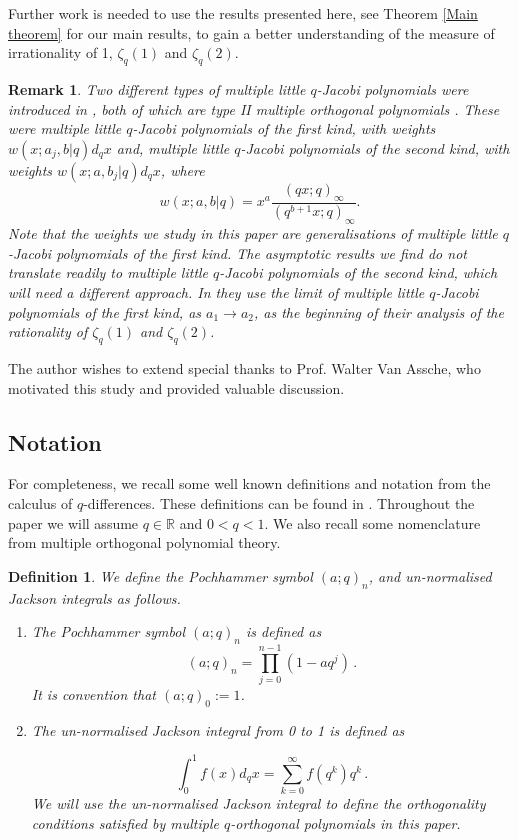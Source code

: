 \documentclass[a4paper,reqno]{amsart}
\numberwithin{equation}{section}
\newtheorem{remark}[theorem]{Remark}
\newtheorem{definition}[theorem]{Definition}
\numberwithin{figure}{section}
\begin{document}
Further work is needed to use the results presented here, see Theorem \ref{Main theorem} for our main results, to gain a better understanding of the measure of irrationality of 1, $\zeta_q(1)$ and $\zeta_q(2)$.

\begin{remark}\label{why first?}
    Two different types of multiple little $q$-Jacobi polynomials were introduced in  \cite{postelmans2005multiple}, both of which are type II multiple orthogonal polynomials \cite{WVA99}. These were multiple little $q$-Jacobi polynomials of the first kind, with weights $w(x;a_j,b|q)d_qx$ and, multiple little $q$-Jacobi polynomials of the second kind, with weights $w(x;a,b_j|q)d_qx$, where 
    \[ w(x;a,b|q) = x^a\frac{(qx;q)_\infty}{(q^{b+1}x;q)_\infty}.\]
    Note that the weights we study in this paper are generalisations of multiple little $q$-Jacobi polynomials of the first kind. The asymptotic results we find do not translate readily to multiple little $q$-Jacobi polynomials of the second kind, which will need a different approach. In \cite{POSTELMANS2007119} they use the limit of multiple little $q$-Jacobi polynomials of the first kind, as $a_1\to a_2$, as the beginning of their analysis of the rationality of $\zeta_q(1)$ and $\zeta_q(2)$.
\end{remark}

The author wishes to extend special thanks to Prof. Walter Van Assche, who motivated this study and provided valuable discussion.
\subsection{Notation}\label{notation}
For completeness, we recall some well known definitions and notation from the calculus of $q$-differences. These definitions can be found in \cite{Ernst2012}. Throughout the paper we will assume $q \in \mathbb{R}$ and $0<q<1$. We also recall some nomenclature from multiple orthogonal polynomial theory.

\begin{definition}
We define the Pochhammer symbol $(a;q)_{n}$, and un-normalised Jackson integrals as follows.
\begin{enumerate}

\item The Pochhammer symbol $(a;q)_{n}$ is defined as
\begin{equation*}
    (a;q)_{n} = \prod_{j=0}^{n-1}(1-aq^{j}) \,.
\end{equation*}
It is convention that $(a;q)_0:=1$.

\item The un-normalised Jackson integral from 0 to 1 is defined as

\begin{equation}\label{Jackson}
    \int_{0}^{1}f(x)d_{q}x = \sum_{k=0}^{\infty} f(q^{k})q^{k} \,.
\end{equation}
We will use the un-normalised Jackson integral to define the orthogonality conditions satisfied by multiple $q$-orthogonal polynomials in this paper.
\end{enumerate}
\end{definition}
\end{document}
